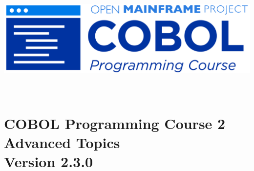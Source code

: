 \begin{center}
  \vspace*{25pt}
\includegraphics{Images/COBOL-Programming-Course.png}
\hypertarget{cobol-programming-course-2}{%
\section*{
  \\[35pt]
  \Huge COBOL Programming Course 2 \\[10pt]
  \Huge Advanced Topics \\[15pt]
  \Large Version 2.3.0}\label{cobol-programming-course-2}}
\end{center}

\pagebreak
